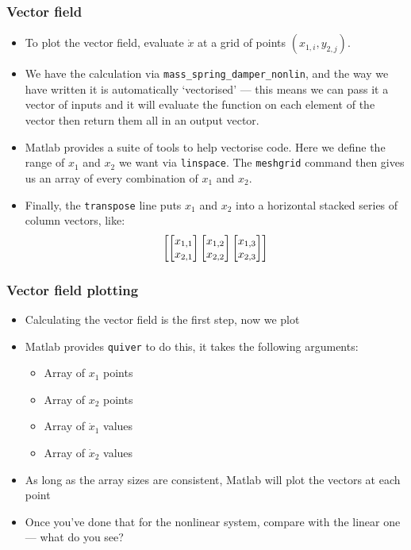 \documentclass[9pt]{beamer-control}
\begin{document}
\begin{frame}
  \frametitle{Vector field}

  \begin{itemize}
    \item
      To plot the vector field, evaluate $\dot x$ at a grid of points $(x_{1,i},y_{2,j})$.

    \item
      We have the calculation via \texttt{mass\_spring\_damper\_nonlin}, and the way we have written it is automatically `vectorised' --- this means we can pass it a vector of inputs and it will evaluate the function on each element of the vector then return them all in an output vector.

    \item
      Matlab provides a suite of tools to help vectorise code. Here we define the range of $x_1$ and $x_2$ we want via \texttt{linspace}. The \texttt{meshgrid} command then gives us an array of every combination of $x_1$ and $x_2$.

    \item
      Finally, the \texttt{transpose} line puts $x_1$ and $x_2$ into a horizontal stacked series of column vectors, like:
      \begin{equation}
        \begin{bmatrix}\begin{bmatrix}x_{1,1}\\x_{2,1}\end{bmatrix}\begin{bmatrix}x_{1,2}\\x_{2,2}\end{bmatrix}\begin{bmatrix}x_{1,3}\\x_{2,3}\end{bmatrix}\end{bmatrix}
      \end{equation}
  \end{itemize}


\end{frame}

\begin{frame}
  \frametitle{Vector field plotting}

  \begin{itemize}
    \item
      Calculating the vector field is the first step, now we plot
    \item
      Matlab provides \texttt{quiver} to do this, it takes the following arguments:
      \begin{itemize}
        \item Array of $x_1$ points
        \item Array of $x_2$ points
        \item Array of $\dot x_1$ values
        \item Array of $\dot x_2$ values
      \end{itemize}
    \item As long as the array sizes are consistent, Matlab will plot the vectors at each point
    \item Once you've done that for the nonlinear system, compare with the linear one --- what do you see?
  \end{itemize}


\end{frame}
\end{document}
